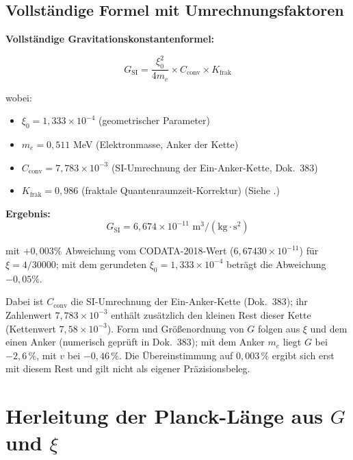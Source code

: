 	\subsection{Vollständige Formel mit Umrechnungsfaktoren}
	
	\begin{keyresult}
		\textbf{Vollständige Gravitationskonstantenformel:}
		
		\begin{equation}
			\boxed{G_{\text{SI}} = \frac{\xi_0^2}{4 m_e} \times C_{\text{conv}} \times K_{\text{frak}}}
			\label{eq:G_complete}
		\end{equation}
		
		wobei:
		\begin{itemize}
			\item $\xi_0 = 1{,}333 \times 10^{-4}$ (geometrischer Parameter)
			\item $m_e = 0{,}511$ MeV (Elektronmasse, Anker der Kette)
			\item $C_{\text{conv}} = 7{,}783 \times 10^{-3}$ (SI-Umrechnung der Ein-Anker-Kette, Dok.~383)
			\item $K_{\text{frak}} = 0{,}986$ (fraktale Quantenraumzeit-Korrektur) (Siehe \cite{Fraktale_Korrektur_Herleitung_De}.)
		\end{itemize}
		
		\textbf{Ergebnis:}
		\begin{equation}
			G_{\text{SI}} = 6{,}674 \times 10^{-11} \text{ m}^3/(\text{kg}\cdot\text{s}^2)
		\end{equation}
		
		mit $+0{,}003\%$ Abweichung vom CODATA-2018-Wert ($6{,}67430 \times 10^{-11}$) für $\xi = 4/30000$; mit dem gerundeten $\xi_0 = 1{,}333 \times 10^{-4}$ beträgt die Abweichung $-0{,}05\%$.
		
		Dabei ist $C_{\text{conv}}$ die SI-Umrechnung der Ein-Anker-Kette (Dok.~383); ihr Zahlenwert $7{,}783\times10^{-3}$ enthält zusätzlich den kleinen Rest dieser Kette (Kettenwert $7{,}58\times10^{-3}$). Form und Größenordnung von $G$ folgen aus $\xi$ und dem einen Anker (numerisch geprüft in Dok.~383); mit dem Anker $m_e$ liegt $G$ bei $-2{,}6\,\%$, mit $v$ bei $-0{,}46\,\%$. Die Übereinstimmung auf $0{,}003\,\%$ ergibt sich erst mit diesem Rest und gilt nicht als eigener Präzisionsbeleg.
	\end{keyresult}
	
	\section{Herleitung der Planck-Länge aus $G$ und $\xi$}
	
